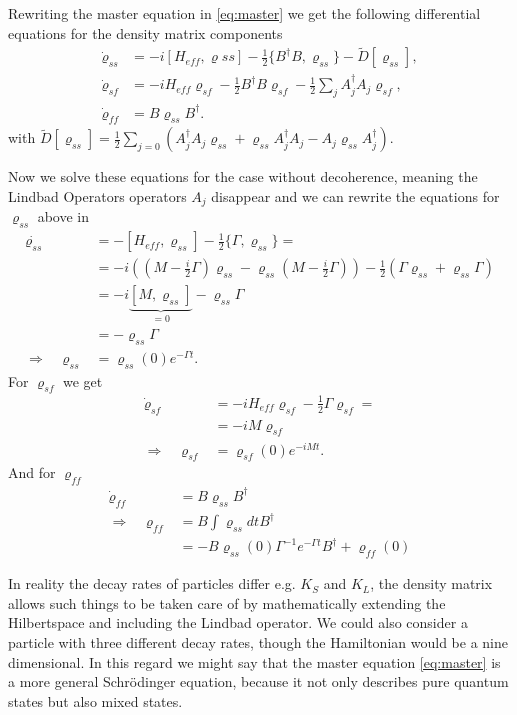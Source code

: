 \documentclass[a4paper]{article}
\begin{document}
Rewriting the master equation in \ref{eq:master} we get the following
differential equations for the density matrix components
\begin{align}
    \dot{\varrho}_{ss} &= -i[H_{eff},\varrho{ss}] - \frac{1}{2}\{B^\dagger
    B,\varrho_{ss} \} - \tilde{D}[\varrho_{ss}],\\
    \dot{\varrho}_{sf} &= -iH_{eff}\varrho_{sf} - \frac{1}{2} B^\dagger B \varrho_{sf}
    -\frac{1}{2}\sum_j A_j^\dagger A_j \varrho_{sf},\\
    \dot{\varrho}_{ff} &=B\varrho_{ss}B^\dagger .
\end{align}
with $\tilde{D}[\varrho_{ss}] = \frac{1}{2} \sum_{j=0} (A^{\dagger}_j A_j
\varrho_{ss} + \varrho_{ss}
    A^{\dagger}_j A_j - A_j \varrho_{ss} A^{\dagger}_j)$.\newline

Now we solve these equations for the case without decoherence, meaning the
Lindbad Operators operators $A_j$ disappear and we can rewrite the equations
for $\varrho_{ss}$ above in
\begin{align}
    \dot{\varrho_{ss}} &= -[H_{eff}, \varrho_{ss}] - \frac{1}{2} \{\Gamma,
    \varrho_{ss}\}=\\
    &=-i((M-\frac{i}{2}\Gamma)\varrho_{ss} - \varrho_{ss}(M-\frac{i}{2}\Gamma))
    -\frac{1}{2}(\Gamma \varrho_{ss} + \varrho_{ss}\Gamma)\\
    &= -i\underbrace{[M, \varrho_{ss}]}_{=0} - \varrho_{ss} \Gamma\\
    &= -\varrho_{ss}\Gamma \\
    \Rightarrow \;\;\; \varrho_{ss} &= \varrho_{ss}(0) e^{-\Gamma t}.
\end{align}
For $\varrho_{sf}$ we get
\begin{align}
    \dot{\varrho}_{sf} &= -i H_{eff} \varrho_{sf} - \frac{1}{2} \Gamma
    \varrho_{sf} =\\
    &= -iM\varrho_{sf}\\
    \Rightarrow \;\;\; \varrho_{sf} &= \varrho_{sf}(0) e^{-iM t}.
\end{align}
And for $\varrho_{ff}$
\begin{align}
    \dot{\varrho}_{ff} &= B\varrho_{ss}B^\dagger \\
    \Rightarrow \;\;\; \varrho_{ff}&= B\int \varrho_{ss}dt B^\dagger \\
    &= -B\varrho_{ss}(0) \Gamma^{-1} e^{-\Gamma t} B^\dagger + \varrho_{ff}(0)
\end{align}

In reality the decay rates of particles differ e.g. $K_S$ and $K_L$, the
density matrix allows such things to be taken care of by mathematically
extending the Hilbertspace and including the Lindbad operator. We could also
consider a particle with three different decay rates, though the Hamiltonian
would be a nine dimensional. In this regard we might say that the master
equation \ref{eq:master} is a more general Schrödinger equation,
because it not only describes pure quantum states but
also mixed states.

\nocite{carla}
\nocite{bgh}
\nocite{mexico}
\printbibliography
\end{document}
